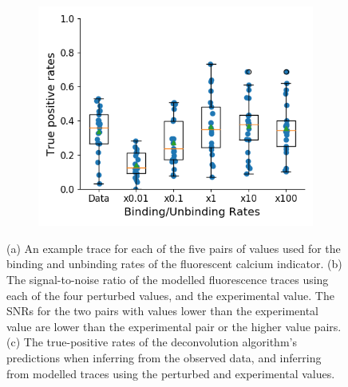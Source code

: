 \begin{figure}[p]
\begin{subfigure}{0.45\textwidth}
        \includegraphics[width=\linewidth]{figures/calcium_chapter/b_i_f_i_perturbed_oasis_tp_paper.png}
        \caption{}
        \label{fig:rates_perturbed_inference}
    \end{subfigure}
    \caption{(a) An example trace for each of the five pairs of values used for the binding and unbinding rates of the fluorescent calcium indicator. (b) The signal-to-noise ratio of the modelled fluorescence traces using each of the four perturbed values, and the experimental value. The SNRs for the two pairs with values lower than the experimental value are lower than the experimental pair or the higher value pairs. (c) The true-positive rates of the deconvolution algorithm's predictions when inferring from the observed data, and inferring from modelled traces using the perturbed and experimental values.}
    \label{fig:rates_perturbed}
\end{figure}

